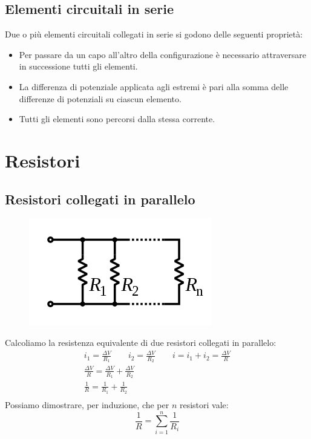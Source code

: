 \subsection*{Elementi circuitali in serie}
Due o più elementi circuitali collegati in serie si godono delle seguenti proprietà:
\begin{itemize}
\item{Per passare da un capo all'altro della configurazione è necessario attraversare in successione tutti gli elementi.}
\item{La differenza di potenziale applicata agli estremi è pari alla somma delle differenze di potenziali su ciascun elemento.}
\item{Tutti gli elementi sono percorsi dalla stessa corrente.}
\end{itemize}

\section{Resistori}

\subsection{Resistori collegati in parallelo}
\begin{figure}[h!]
	\centering
    \includegraphics[scale=0.5]{resistori-parallelo}
\end{figure}
Calcoliamo la resistenza equivalente di due resistori collegati in parallelo:
\begin{displaymath}\begin{aligned}
	i_1 = \frac{\Delta V}{R_1} \qquad i_2 = \frac{\Delta V}{R_2} \qquad i = i_1 + i_2 = \frac{\Delta V}{R}\\
    \frac{\Delta V}{R} = \frac{\Delta V}{R_1} + \frac{\Delta V}{R_2}\\
    \frac{1}{R} = \frac{1}{R_1} + \frac{1}{R_2}\\
\end{aligned}\end{displaymath}
Possiamo dimostrare, per induzione, che per $n$ resistori vale:
\begin{displaymath}
	\frac{1}{R} = \sum_{i=1}^n \frac{1}{R_i}
\end{displaymath}

